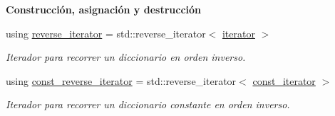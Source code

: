 \begin{Indent}{\bf \-Construcción, asignación y destrucción}
\begin{DoxyCompactItemize}
using \hyperlink{classaed2_1_1iterator_a07b2c0fa31611e03cd019b290acd6d80_a07b2c0fa31611e03cd019b290acd6d80}{reverse\+\_\+iterator} = std\+::reverse\+\_\+iterator$<$ \hyperlink{classaed2_1_1iterator_1_1iterator}{iterator} $>$
\begin{DoxyCompactList}\small\item\em Iterador para recorrer un diccionario en orden inverso. \end{DoxyCompactList}\item 
using \hyperlink{classaed2_1_1iterator_a657402896e5b5966660032f5686cc4c4_a657402896e5b5966660032f5686cc4c4}{const\+\_\+reverse\+\_\+iterator} = std\+::reverse\+\_\+iterator$<$ \hyperlink{classaed2_1_1iterator_1_1const__iterator}{const\+\_\+iterator} $>$
\begin{DoxyCompactList}\small\item\em Iterador para recorrer un diccionario constante en orden inverso. \end{DoxyCompactList}\end{DoxyCompactItemize}

\end{Indent}
